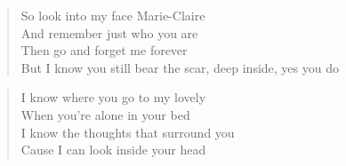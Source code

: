 \documentclass[9pt,a4paper,oneside, onecolumn]{article}
\begin{document}
\begin{multicols}{2}
\begin{verse}
So look into my face Marie-Claire\\
And remember just who you are\\
Then go and forget me forever\\
But I know you still bear the scar, deep inside, yes you do\\
\end{verse}

\begin{verse}
I know where you go to my lovely\\
When you're alone in your bed\\
I know the thoughts that surround you\\
Cause I can look inside your head\\
\end{verse}

\end{multicols}
\end{document}
